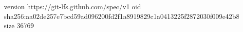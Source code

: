 version https://git-lfs.github.com/spec/v1
oid sha256:aa02de257e7bcd59ad096200fd2f1a8919829c1a0413225f2872030f009e42b8
size 36769
